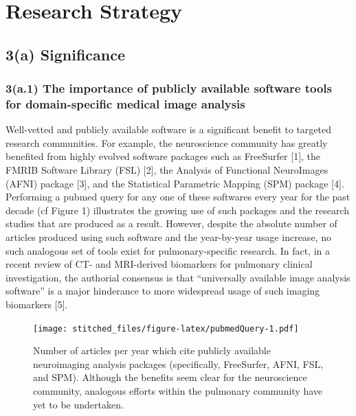 \documentclass[11pt,]{article}
\begin{document}
\newpage

\section{Research Strategy}\label{research-strategy}

\subsection{\textbf{3(a) Significance}}\label{a-significance}

\subsubsection{3(a.1) The importance of publicly available software
tools for domain-specific medical image
analysis}\label{a.1-the-importance-of-publicly-available-software-tools-for-domain-specific-medical-image-analysis}

Well-vetted and publicly available software is a significant benefit to
targeted research communities. For example, the neuroscience community
has greatly benefited from highly evolved software packages such as
FreeSurfer {[}1{]}, the FMRIB Software Library (FSL) {[}2{]}, the
Analysis of Functional NeuroImages (AFNI) package {[}3{]}, and the
Statistical Parametric Mapping (SPM) package {[}4{]}. Performing a
pubmed query for any one of these softwares every year for the past
decade (cf Figure 1) illustrates the growing use of such packages and
the research studies that are produced as a result. However, despite the
absolute number of articles produced using such software and the
year-by-year usage increase, no such analogous set of tools exist for
pulmonary-specific research. In fact, in a recent review of CT- and
MRI-derived biomarkers for pulmonary clinical investigation, the
authorial consensus is that ``universally available image analysis
software'' is a major hinderance to more widespread usage of such
imaging biomarkers {[}5{]}.

\begin{figure}[htbp]
\centering
\texttt{[image: stitched\_files/figure-latex/pubmedQuery-1.pdf]}
\caption{Number of articles per year which cite publicly available
neuroimaging analysis packages (specifically, FreeSurfer, AFNI, FSL, and
SPM). Although the benefits seem clear for the neuroscience community,
analogous efforts within the pulmonary community have yet to be
undertaken.}
\end{figure}
\end{document}
